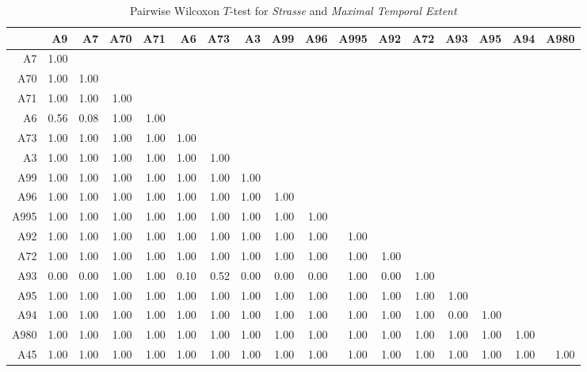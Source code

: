 \begin{table}[ht!]
	\tiny
	\setlength{\tabcolsep}{4pt}
	\centering
  \begin{tabular}{rrrrrrrrrrrrrrrrr}
    \hline
         & A9 & A7 & A70 & A71 & A6 & A73 & A3 & A99 & A96 & A995 & A92 & A72 & A93 & A95 & A94 & A980 \\ 
    \hline
    A7   & 1.00 &  &  &  &  &  &  &  &  &  &  &  &  &  &  &  \\ 
    A70  & 1.00 & 1.00 &  &  &  &  &  &  &  &  &  &  &  &  &  &  \\ 
    A71  & 1.00 & 1.00 & 1.00 &  &  &  &  &  &  &  &  &  &  &  &  &  \\ 
    A6   & 0.56 & 0.08 & 1.00 & 1.00 &  &  &  &  &  &  &  &  &  &  &  &  \\ 
    A73  & 1.00 & 1.00 & 1.00 & 1.00 & 1.00 &  &  &  &  &  &  &  &  &  &  &  \\ 
    A3   & 1.00 & 1.00 & 1.00 & 1.00 & 1.00 & 1.00 &  &  &  &  &  &  &  &  &  &  \\ 
    A99  & 1.00 & 1.00 & 1.00 & 1.00 & 1.00 & 1.00 & 1.00 &  &  &  &  &  &  &  &  &  \\ 
    A96  & 1.00 & 1.00 & 1.00 & 1.00 & 1.00 & 1.00 & 1.00 & 1.00 &  &  &  &  &  &  &  &  \\ 
    A995 & 1.00 & 1.00 & 1.00 & 1.00 & 1.00 & 1.00 & 1.00 & 1.00 & 1.00 &  &  &  &  &  &  &  \\ 
    A92  & 1.00 & 1.00 & 1.00 & 1.00 & 1.00 & 1.00 & 1.00 & 1.00 & 1.00 & 1.00 &  &  &  &  &  &  \\ 
    A72  & 1.00 & 1.00 & 1.00 & 1.00 & 1.00 & 1.00 & 1.00 & 1.00 & 1.00 & 1.00 & 1.00 &  &  &  &  &  \\ 
    A93  & 0.00 & 0.00 & 1.00 & 1.00 & 0.10 & 0.52 & 0.00 & 0.00 & 0.00 & 1.00 & 0.00 & 1.00 &  &  &  &  \\ 
    A95  & 1.00 & 1.00 & 1.00 & 1.00 & 1.00 & 1.00 & 1.00 & 1.00 & 1.00 & 1.00 & 1.00 & 1.00 & 1.00 &  &  &  \\ 
    A94  & 1.00 & 1.00 & 1.00 & 1.00 & 1.00 & 1.00 & 1.00 & 1.00 & 1.00 & 1.00 & 1.00 & 1.00 & 0.00 & 1.00 &  &  \\ 
    A980 & 1.00 & 1.00 & 1.00 & 1.00 & 1.00 & 1.00 & 1.00 & 1.00 & 1.00 & 1.00 & 1.00 & 1.00 & 1.00 & 1.00 & 1.00 &  \\ 
    A45  & 1.00 & 1.00 & 1.00 & 1.00 & 1.00 & 1.00 & 1.00 & 1.00 & 1.00 & 1.00 & 1.00 & 1.00 & 1.00 & 1.00 & 1.00 & 1.00 \\ 
    \hline
  \end{tabular}
	\caption{Pairwise Wilcoxon $T$-test for \textit{Strasse} and \textit{Maximal Temporal Extent}}
	\label{tbl:wilcoxon_baysis_matched_Strasse_TMax}
\end{table}
